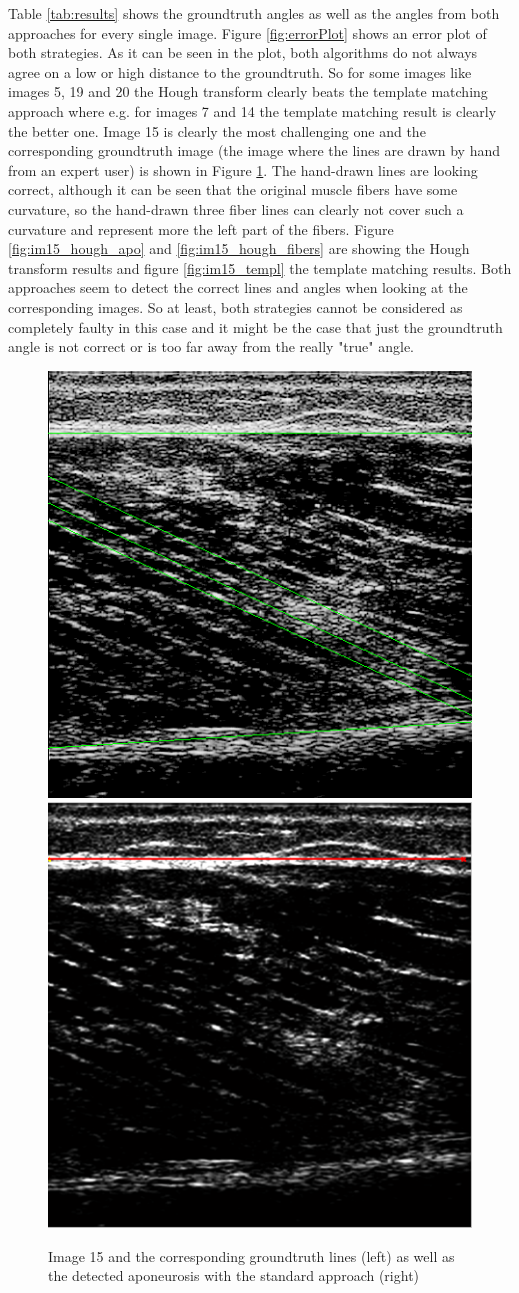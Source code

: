 \documentclass[10pt,twocolumn,letterpaper]{article}
\begin{document}
Table \ref{tab:results} shows the groundtruth angles as well as the angles from both approaches for every single image.
Figure \ref{fig:errorPlot} shows an error plot of both strategies. As it can be seen in the plot, both algorithms do not always agree on a low or high distance to the groundtruth. So for some images like images 5, 19 and 20 the Hough transform clearly beats the template matching approach where e.g. for images 7 and 14 the template matching result is clearly the better one.
Image 15 is clearly the most challenging one and the corresponding groundtruth image (the image where the lines are drawn by hand from an expert user) is shown in Figure \ref{fig:im15_gt}. 
The hand-drawn lines are looking correct, although it can be seen that the original muscle fibers have some curvature, so the hand-drawn three fiber lines can clearly not cover such a curvature and represent more the left part of the fibers.
Figure \ref{fig:im15_hough_apo} and \ref{fig:im15_hough_fibers} are showing the Hough transform results and figure \ref{fig:im15_templ} the template matching results.
Both approaches seem to detect the correct lines and angles when looking at the corresponding images. So at least, both strategies cannot be considered as completely faulty in this case and it might be the case that just the groundtruth angle is not correct or is too far away from the really "true" angle.

\begin{figure}
	\begin{center}		
		\includegraphics[width=0.47\linewidth]{img/im15_gt}
		\includegraphics[width=0.47\linewidth]{img/im15_hough_apo}
	\end{center}
	\caption{Image 15 and the corresponding groundtruth lines (left) as well as the detected aponeurosis with the standard approach (right)}
	\label{fig:im15_gt}
	
\end{figure}
\end{document}
